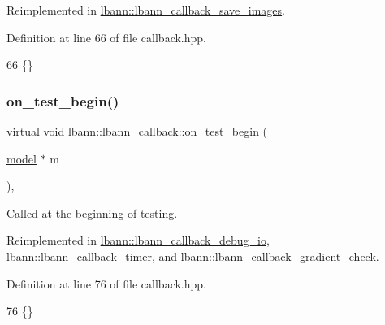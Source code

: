 Reimplemented in \hyperlink{classlbann_1_1lbann__callback__save__images_a4591438de0b52467988e2bd34b55c0dd}{lbann\+::lbann\+\_\+callback\+\_\+save\+\_\+images}.



Definition at line 66 of file callback.\+hpp.


\begin{DoxyCode}
66 \{\}
\end{DoxyCode}
\mbox{\label{classlbann_1_1lbann__callback_a716bff45bdc5a88eed09c2231f5bc93a}} 
\subsubsection{\texorpdfstring{on\+\_\+test\+\_\+begin()}{on\_test\_begin()}}
{\footnotesize\ttfamily virtual void lbann\+::lbann\+\_\+callback\+::on\+\_\+test\+\_\+begin (\begin{DoxyParamCaption}\item[{\hyperlink{classlbann_1_1model}{model} $\ast$}]{m }\end{DoxyParamCaption})\hspace{0.3cm}{\ttfamily [inline]}, {\ttfamily [virtual]}}

Called at the beginning of testing. 

Reimplemented in \hyperlink{classlbann_1_1lbann__callback__debug__io_a469dfa4eece0a707a2d56f4c67aea9b7}{lbann\+::lbann\+\_\+callback\+\_\+debug\+\_\+io}, \hyperlink{classlbann_1_1lbann__callback__timer_a9fb5327fa629c23e51c9c3b065d6d8c5}{lbann\+::lbann\+\_\+callback\+\_\+timer}, and \hyperlink{classlbann_1_1lbann__callback__gradient__check_ab62102d5ab30330386514161b9ee6586}{lbann\+::lbann\+\_\+callback\+\_\+gradient\+\_\+check}.



Definition at line 76 of file callback.\+hpp.


\begin{DoxyCode}
76 \{\}
\end{DoxyCode}
\mbox{\label{classlbann_1_1lbann__callback_accbad4dd004c1ced33642db6398b2efe}} 
